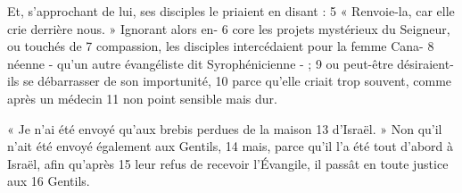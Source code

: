 Et, s'approchant de lui, ses disciples le priaient en disant :	 
5	 	« Renvoie-la, car elle crie derrière nous. » Ignorant alors en-	 
6	 	core les projets mystérieux du Seigneur, ou touchés de	 
7	 	compassion, les disciples intercédaient pour la femme Cana-	 
8	 	néenne - qu'un autre évangéliste dit Syrophénicienne - ;	 
9	 	ou peut-être désiraient-ils se débarrasser de son importunité,	 
10	 	parce qu'elle criait trop souvent, comme après un médecin	 
11	 	non point sensible mais dur.

« Je n'ai été envoyé qu'aux brebis perdues de la maison	 
13	 	d'Israël. » Non qu'il n'ait été envoyé également aux Gentils,	 
14	 	mais, parce qu'il l'a été tout d'abord à Israël, afin qu'après	 
15	 	leur refus de recevoir l'Évangile, il passât en toute justice aux	 
16	 	Gentils.